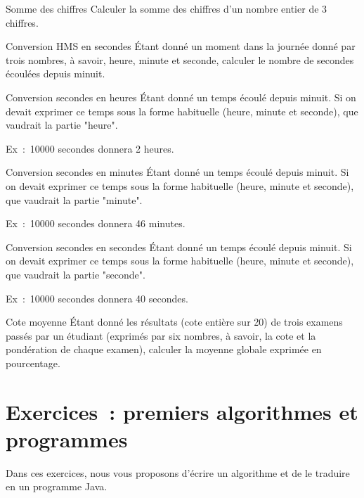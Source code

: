 \begin{Exercice}{Somme des chiffres}
	Calculer la somme des chiffres
	d’un nombre entier de 3 chiffres.
\end{Exercice}

\begin{Exercice}{Conversion HMS en secondes}
	Étant donné un moment dans la journée donné
	par trois nombres, à savoir, heure, minute et seconde, calculer le
	nombre de secondes écoulées depuis minuit.
\end{Exercice}

\begin{Exercice}{Conversion secondes en heures}
	Étant donné un temps écoulé depuis minuit.
	Si on devait exprimer ce temps sous la forme
	habituelle (heure, minute et seconde),
	que vaudrait la partie "heure".

	Ex~:~10000 secondes donnera 2 heures.
\end{Exercice}

\begin{Exercice}{Conversion secondes en minutes}
	Étant donné un temps écoulé depuis minuit.
	Si on devait exprimer ce temps sous la forme
	habituelle (heure, minute et seconde),
	que vaudrait la partie "minute".

	Ex~:~10000 secondes donnera 46 minutes.
\end{Exercice}

\begin{Exercice}{Conversion secondes en secondes}
	Étant donné un temps écoulé depuis minuit.
	Si on devait exprimer ce temps sous la forme
	habituelle (heure, minute et seconde),
	que vaudrait la partie "seconde".

	Ex~:~10000 secondes donnera 40 secondes.
\end{Exercice}	

\begin{Exercice}{Cote moyenne}
	Étant donné les résultats (cote entière sur
	20) de trois examens passés par un étudiant (exprimés par six nombres,
	à savoir, la cote et la pondération de chaque examen), calculer 
	la moyenne globale exprimée en pourcentage.
\end{Exercice}


\clearpage
\section{Exercices~: premiers algorithmes et programmes}
\label{prem-ex-simple}

Dans ces exercices, nous vous proposons d'écrire un algorithme et de le traduire
en un programme Java. 

